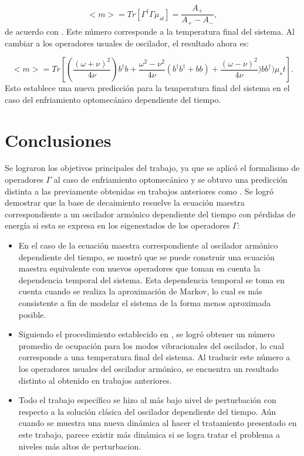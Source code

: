 \documentclass[a4paper,10pt]{report}
\begin{document}
\begin{equation}
<m> = Tr[\Gamma^\dagger \Gamma \mu_{st}] = \frac{A_+}{A_+ - A_-},
\end{equation} de acuerdo con \cite{BarberisLC}. Este número corresponde a la temperatura final del sistema. Al cambiar a los operadores usuales de oscilador, el resultado ahora es:

\begin{equation}
<m> = Tr[(\frac{(\omega + \nu )^2}{4\nu})b^\dagger b +\frac{\omega^2 - \nu^2}{4\nu}(b^\dagger b^\dagger +bb) +\frac{(\omega - \nu )^2}{4\nu}) b b^\dagger)\mu_st].
\end{equation} Esto establece una nueva predicción para la temperatura final del sistema en el caso del enfriamiento optomecánico dependiente del tiempo.


\chapter{Conclusiones}

Se lograron los objetivos principales del trabajo, ya que se aplicó el formalismo de operadores $\Gamma$ al caso de enfriamiento optomecánico y se obtuvo una predicción distinta a las previamente obtenidas en trabajos anteriores como \cite{BarberisLC}. Se logró demostrar que la base de decaimiento resuelve la ecuación maestra correspondiente a un oscilador armónico dependiente del tiempo con pérdidas de energía si esta se expresa en los eigenestados de los operadores $\Gamma$:

\begin{itemize}
\item En el caso de la ecuación maestra correspondiente al oscilador armónico dependiente del tiempo, se mostró que se puede construir una ecuación maestra equivalente con nuevos operadores que toman en cuenta la dependencia temporal del sistema. Esta dependencia temporal se toma en cuenta cuando se realiza la aproximación de Markov, lo cual es más consistente a fin de modelar el sistema de la forma menos aproximada posible.

\item Siguiendo el procedimiento establecido en \cite{BarberisLC}, se logró obtener un número promedio de ocupación para los modos vibracionales del oscilador, lo cual corresponde a una temperatura final del sistema. Al traducir este número a los operadores usuales del oscilador armónico, se encuentra un resultado distinto al obtenido en trabajos anteriores.

\item Todo el trabajo específico se hizo al más bajo nivel de perturbación con respecto a la solución clásica del oscilador dependiente del tiempo. Aún cuando se muestra una nueva dinámica al hacer el tratamiento presentado en este trabajo, parece existir más dinámica si se logra tratar el problema a niveles más altos de perturbacion.
\end{itemize}
\end{document}
